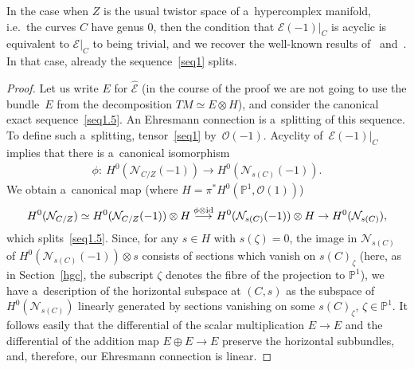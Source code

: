 \documentclass[pdftex]{sigma}
\numberwithin{equation}{section}
\begin{document}
\begin{Remark}
In the case when $Z$ is the usual twistor space of a~hypercomplex manifold, i.e.\
the curves $C$ have genus $0$, then the condition that ${\mathcal{E}}(-1)|_{C}$ is acyclic is equivalent to
${\mathcal{E}}|_C$ to being trivial, and we recover the well-known results of~\cite{W} and~\cite{HM}.
In that case, already the sequence~\eqref{seq1} splits.
\end{Remark}

\begin{proof}
Let us write $E$ for $\widehat{{\mathcal{E}}}$ (in the course of the proof we are not going to use the bundle~$E$ from
the decomposition $TM\simeq E\otimes H$), and consider the canonical exact sequence~\eqref{seq1.5}.
An Ehresmann connection is a~splitting of this sequence.
To def\/ine such a~splitting, tensor~\eqref{seq1} by~${\mathcal{O}}(-1)$.
Acyclity of~${\mathcal{E}}(-1)|_{C}$ implies that there is a~canonical isomorphism
\begin{gather*}
\phi: \ H^0({\mathcal{N}}_{C/Z}(-1))\to H^0( {\mathcal{N}}_{s(C)}(-1)).
\end{gather*}
We obtain a~canonical map (where $H=\pi^\ast H^0({\mathbb{P}}^1,{\mathcal{O}}(1))$)
\begin{gather*}
H^0({\mathcal{N}}_{C/Z})\simeq H^0({\mathcal{N}}_{C/Z}(-1))\otimes H\stackrel{\phi\otimes{\rm id}}{\longrightarrow} H^0(
{\mathcal{N}}_{s(C)}(-1))\otimes H \to H^0( {\mathcal{N}}_{s(C)}),
\end{gather*}
which splits~\eqref{seq1.5}.
Since, for any $s\in H$ with $s(\zeta)=0$, the image in ${\mathcal{N}}_{s(C)}$ of $H^0( {\mathcal{N}}_{s(C)}(-1))\otimes
s$ consists of sections which vanish on $s(C)_\zeta$ (here, as in Section~\ref{hgc}, the subscript $\zeta$ denotes the f\/ibre
of the projection to ${\mathbb{P}}^1$), we have a~description of the horizontal subspace at $(C,s)$ as the subspace of
$H^0( {\mathcal{N}}_{s(C)})$ linearly generated by sections vanishing on some $s(C)_\zeta$, $\zeta\in {\mathbb{P}}^1$.
It follows easily that the dif\/ferential of the scalar multiplication $E\to E$ and the dif\/ferential of the addition map
$E\oplus E\to E$ preserve the horizontal subbundles, and, therefore, our Ehresmann connection is linear.


\end{proof}
\end{document}
